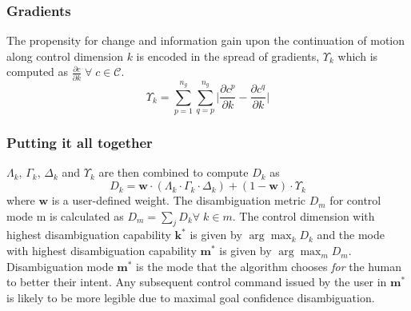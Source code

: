 \documentclass[conference]{IEEEtran}
\newcommand{\argmax}{\arg\!\max}
\begin{document}
\subsubsection{Gradients}
The propensity for change and information gain upon the continuation of motion along control dimension $k$ is encoded in the spread of gradients, $\Upsilon_{k}$ which is computed as  $\frac{\partial c}{\partial k}\; \forall\; c\in \mathcal{C}$. 
\begin{equation*}
\Upsilon_{k} = \sum_{p=1}^{n_g}\sum_{q=p}^{n_g}\Big \lvert\frac{\partial c^p}{\partial k} - \frac{\partial c^q}{\partial k}\Big \rvert
\end{equation*}

\subsubsection*{Putting it all together}
$\Lambda_{k}$, $\Gamma_{k}$, $\Delta_{k}$ and $\Upsilon_{k}$ are then combined to compute $D_{k}$ as 
\begin{equation*}\label{DK}
D_{k} = \boldsymbol{w}\cdot(\Lambda_{k}\cdot \Gamma_{k}\cdot \Delta_{k}) + (1 - \boldsymbol{w})\cdot \Upsilon_{k}
\end{equation*}
where $\boldsymbol{w}$ is a user-defined weight.
The disambiguation metric $D_m$ for control mode m is calculated as $D_m = \sum_{j} D_{k} \forall \;k\in m$.
The control dimension with highest disambiguation capability $\boldsymbol{k}^*$ is given by $\argmax_k D_{k}$
 and the mode with highest disambiguation capability $\boldsymbol{m}^{*}$ is given by $\argmax_m D_m$.
Disambiguation mode $\boldsymbol{m}^{*}$ is the mode that the algorithm chooses \textit{for} the human to better their intent. Any subsequent control command issued by the user in $\boldsymbol{m}^*$ is likely to be more legible due to maximal goal confidence disambiguation.
\end{document}
